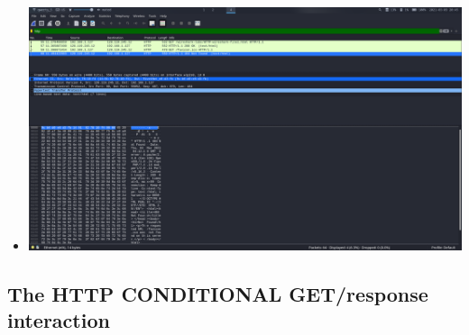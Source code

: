 \documentclass[11pt]{article}
\begin{document}
\begin{enumerate}
\begin{itemize}
  \item \includegraphics[width=\textwidth]{img/ws-raw-data-4}
  \end{itemize}
\end{enumerate}


\subsection{The HTTP CONDITIONAL GET/response interaction}
\end{document}
